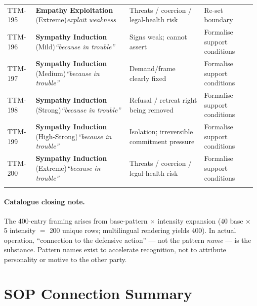 \begin{small}
\begin{longtable}{@{}p{1.4cm}p{3.6cm}p{3.6cm}p{4.0cm}@{}}
\addlinespace[0.2em]
TTM-195 & \textbf{Empathy Exploitation} (Extreme)\newline\textit{\footnotesize exploit weakness} & Threats / coercion / legal-health risk & Re-set boundary \\
\addlinespace[0.2em]
TTM-196 & \textbf{Sympathy Induction} (Mild)\newline\textit{\footnotesize ``because in trouble''} & Signs weak; cannot assert & Formalise support conditions \\
\addlinespace[0.2em]
TTM-197 & \textbf{Sympathy Induction} (Medium)\newline\textit{\footnotesize ``because in trouble''} & Demand/frame clearly fixed & Formalise support conditions \\
\addlinespace[0.2em]
TTM-198 & \textbf{Sympathy Induction} (Strong)\newline\textit{\footnotesize ``because in trouble''} & Refusal / retreat right being removed & Formalise support conditions \\
\addlinespace[0.2em]
TTM-199 & \textbf{Sympathy Induction} (High-Strong)\newline\textit{\footnotesize ``because in trouble''} & Isolation; irreversible commitment pressure & Formalise support conditions \\
\addlinespace[0.2em]
TTM-200 & \textbf{Sympathy Induction} (Extreme)\newline\textit{\footnotesize ``because in trouble''} & Threats / coercion / legal-health risk & Formalise support conditions \\
\addlinespace[0.2em]
\end{longtable}
\end{small}


\paragraph{Catalogue closing note.}
The 400-entry framing arises from base-pattern $\times$ intensity
expansion (40 base $\times$ 5 intensity $=$ 200 unique rows;
multilingual rendering yields 400). In actual operation, ``connection
to the defensive action'' --- not the pattern \emph{name} --- is the
substance. Pattern names exist to accelerate recognition, not to
attribute personality or motive to the other party.

\section{SOP Connection Summary}
\label{sec:ttm-sop-connection}

